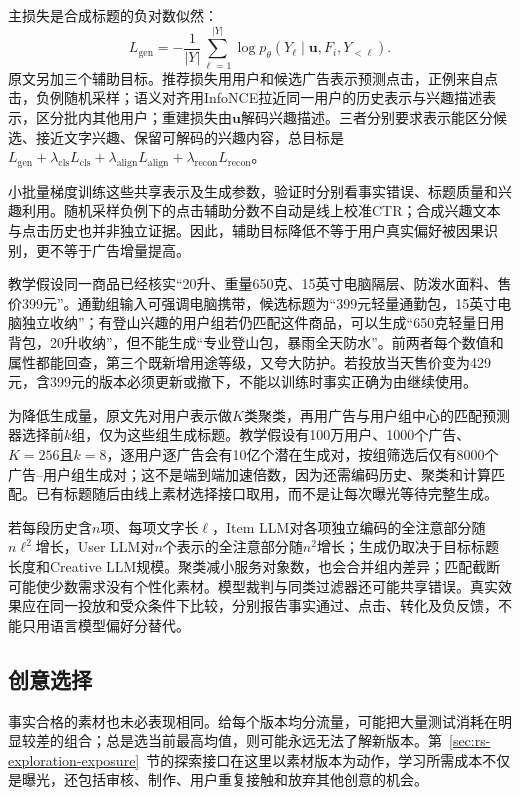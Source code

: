主损失是合成标题的负对数似然：
\[
  L_{\mathrm{gen}}
    =-\frac{1}{|Y|}\sum_{\ell=1}^{|Y|}
       \log p_\theta(Y_\ell\mid\bm{u},F_i,Y_{<\ell}).
\]
原文另加三个辅助目标。推荐损失用用户和候选广告表示预测点击，正例来自点击，负例随机采样；语义对齐用InfoNCE拉近同一用户的历史表示与兴趣描述表示，区分批内其他用户；重建损失由$\bm{u}$解码兴趣描述。三者分别要求表示能区分候选、接近文字兴趣、保留可解码的兴趣内容，总目标是$L_{\mathrm{gen}}+\lambda_{\mathrm{cls}}L_{\mathrm{cls}}+\lambda_{\mathrm{align}}L_{\mathrm{align}}+\lambda_{\mathrm{recon}}L_{\mathrm{recon}}$。

小批量梯度训练这些共享表示及生成参数，验证时分别看事实错误、标题质量和兴趣利用。随机采样负例下的点击辅助分数不自动是线上校准CTR；合成兴趣文本与点击历史也并非独立证据。因此，辅助目标降低不等于用户真实偏好被因果识别，更不等于广告增量提高。

教学假设同一商品已经核实“20升、重量650克、15英寸电脑隔层、防泼水面料、售价399元”。通勤组输入可强调电脑携带，候选标题为“399元轻量通勤包，15英寸电脑独立收纳”；有登山兴趣的用户组若仍匹配这件商品，可以生成“650克轻量日用背包，20升收纳”，但不能生成“专业登山包，暴雨全天防水”。前两者每个数值和属性都能回查，第三个既新增用途等级，又夸大防护。若投放当天售价变为429元，含399元的版本必须更新或撤下，不能以训练时事实正确为由继续使用。

为降低生成量，原文先对用户表示做$K$类聚类，再用广告与用户组中心的匹配预测器选择前$k$组，仅为这些组生成标题。教学假设有100万用户、1000个广告、$K=256$且$k=8$，逐用户逐广告会有10亿个潜在生成对，按组筛选后仅有8000个广告--用户组生成对；这不是端到端加速倍数，因为还需编码历史、聚类和计算匹配。已有标题随后由线上素材选择接口取用，而不是让每次曝光等待完整生成。

若每段历史含$n$项、每项文字长$\ell$，Item LLM对各项独立编码的全注意部分随$n\ell^2$增长，User LLM对$n$个表示的全注意部分随$n^2$增长；生成仍取决于目标标题长度和Creative LLM规模。聚类减小服务对象数，也会合并组内差异；匹配截断可能使少数需求没有个性化素材。模型裁判与同类过滤器还可能共享错误。真实效果应在同一投放和受众条件下比较，分别报告事实通过、点击、转化及负反馈，不能只用语言模型偏好分替代。

\subsection{创意选择}
\label{sec:rs-advertising-creative-selection}

事实合格的素材也未必表现相同。给每个版本均分流量，可能把大量测试消耗在明显较差的组合；总是选当前最高均值，则可能永远无法了解新版本。第~\ref{sec:rs-exploration-exposure}~节的探索接口在这里以素材版本为动作，学习所需成本不仅是曝光，还包括审核、制作、用户重复接触和放弃其他创意的机会。

